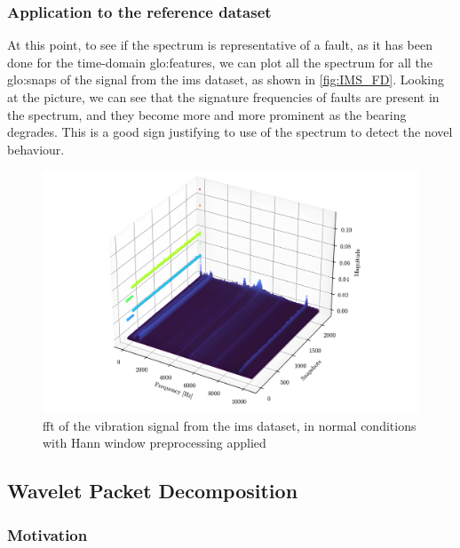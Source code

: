 \subsubsection{Application to the reference dataset}

At this point, to see if the spectrum is representative of a fault, as it has been done for the time-domain \gls{glo:feature}s, we can plot all the spectrum for all the \gls{glo:snap}s of the  signal from the \gls{ims} dataset, as shown in \autoref{fig:IMS_FD}. Looking at the picture, we can see that the signature frequencies of faults are present in the spectrum, and they become more and more prominent as the bearing degrades. This is a good sign justifying to use of the spectrum to detect the novel behaviour.

\begin{figure}
    \centering
    \includegraphics[width=\textwidth]{images/FeatureExtraction/FD_IMS.png}
    \caption{\gls{fft} of the  vibration signal from the \gls{ims} dataset, in normal conditions with Hann window preprocessing
    applied}
    \label{fig:IMS_FD}
\end{figure}


\subsection{Wavelet Packet Decomposition}
\label{sec:WPD}

\subsubsection{Motivation}

